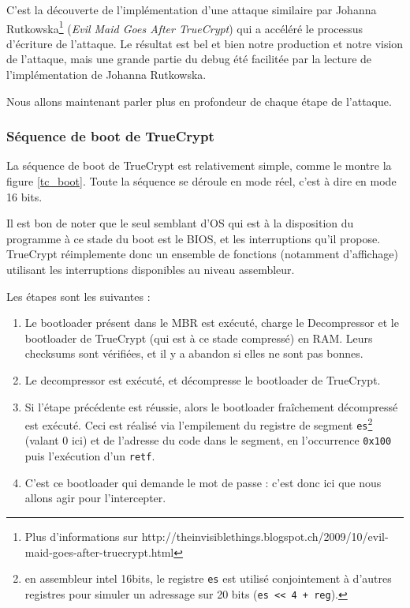 \documentclass[12pt,a4paper]{article}
\begin{document}
C'est la découverte de l'implémentation d'une attaque similaire par Johanna
Rutkowska\footnote{Plus d'informations sur
http://theinvisiblethings.blogspot.ch/2009/10/evil-maid-goes-after-truecrypt.html}
(\textit{Evil Maid Goes After TrueCrypt}) qui a accéléré le processus
d'écriture de l'attaque. Le résultat est bel et bien notre production et notre
vision de l'attaque, mais une grande partie du debug été facilitée par la
lecture de l'implémentation de Johanna Rutkowska.

Nous allons maintenant parler plus en profondeur de chaque étape de l'attaque.

\subsubsection{Séquence de boot de TrueCrypt}

La séquence de boot de TrueCrypt est relativement simple, comme le montre la
figure \ref{tc_boot}. Toute la séquence se déroule en mode réel, c'est à dire
en mode 16 bits.

Il est bon de noter que le seul semblant d'OS qui est à la disposition du
programme à ce stade du boot est le BIOS, et les interruptions qu'il propose.
TrueCrypt réimplemente donc un ensemble de fonctions (notamment d'affichage)
utilisant les interruptions disponibles au niveau assembleur.

Les étapes sont les suivantes :
\begin{enumerate}
    \item Le bootloader présent dans le MBR est exécuté, charge le Decompressor
    et le bootloader de TrueCrypt (qui est à ce stade compressé) en RAM. Leurs
    checksums sont vérifiées, et il y a abandon si elles ne sont pas bonnes.
    \item Le decompressor est exécuté, et décompresse le bootloader de
    TrueCrypt.
    \item Si l'étape précédente est réussie, alors le bootloader fraîchement
    décompressé est exécuté. Ceci est réalisé via l'empilement du registre de
    segment \texttt{es}\footnote{en assembleur intel 16bits, le registre
    \texttt{es} est utilisé conjointement à d'autres registres pour simuler un
    adressage sur 20 bits (\texttt{es << 4 + reg}).} (valant 0 ici) et de
    l'adresse du code dans le segment, en l'occurrence \texttt{0x100} puis
    l'exécution d'un \texttt{retf}.
    \item C'est ce bootloader qui demande le mot de passe : 
    c'est donc ici que nous allons agir pour l'intercepter.
\end{enumerate}
\end{document}
